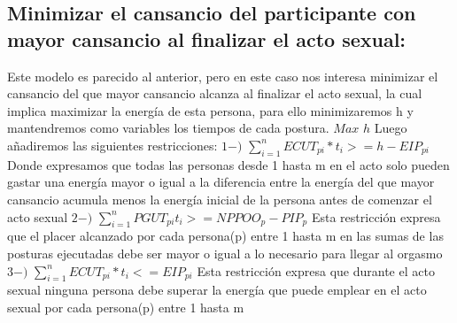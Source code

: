\documentclass{llncs}
\begin{document}
\subsection{Minimizar el cansancio del participante con mayor cansancio al finalizar el acto sexual:}
Este modelo es parecido al anterior, pero en este caso nos interesa minimizar el cansancio del que mayor cansancio alcanza al finalizar el acto sexual, la cual implica maximizar la energía de esta persona, para ello minimizaremos h y mantendremos como variables los tiempos de cada postura.
\newline
\newline
$Max$ $h$
\newline
\newline
Luego añadiremos las siguientes restricciones:
\newline
\newline
$1-)$ $\sum_{i=1}^{n} ECUT_{pi}*t_{i} >= h - EIP_{pi}$
\newline
\newline
Donde expresamos que todas las personas desde 1 hasta m en el acto solo pueden gastar una energía mayor o igual a la diferencia entre la energía del que mayor cansancio acumula menos la energía inicial de la persona antes de comenzar el acto sexual
\newline
\newline
$2-)$ $\sum_{i=1}^{n} PGUT_{pi}t_{i} >= NPPOO_{p} - PIP_{p}$
\newline
\newline
Esta restricción expresa que el placer alcanzado por cada persona(p) entre 1 hasta m en las sumas de las posturas ejecutadas debe ser mayor o igual a lo necesario para llegar al orgasmo
\newline
\newline
$3-)$ $\sum_{i=1}^{n} ECUT_{pi}*t_{i} <= EIP_{pi}$
\newline
\newline
Esta restricción expresa que durante el acto sexual ninguna persona debe superar la energía que puede emplear en el acto sexual por cada persona(p) entre 1 hasta m
\end{document}
